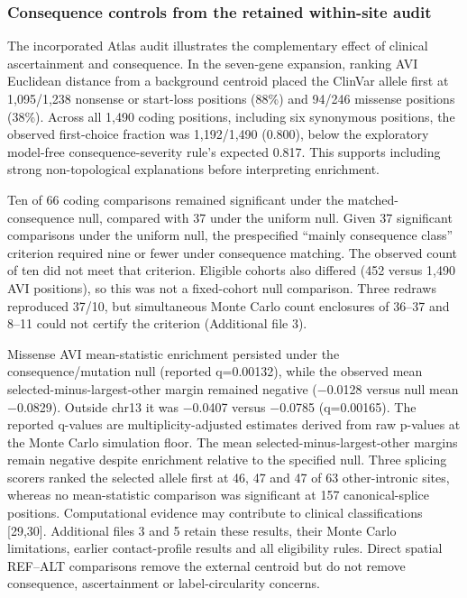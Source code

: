 \documentclass[
  11pt,
]{article}
\begin{document}
\subsubsection{Consequence controls from the retained within-site
audit}\label{consequence-controls-from-the-retained-within-site-audit}

The incorporated Atlas audit illustrates the complementary effect of
clinical ascertainment and consequence. In the seven-gene expansion,
ranking AVI Euclidean distance from a background centroid placed the
ClinVar allele first at 1,095/1,238 nonsense or start-loss positions
(88\%) and 94/246 missense positions (38\%). Across all 1,490 coding
positions, including six synonymous positions, the observed first-choice
fraction was 1,192/1,490 (0.800), below the exploratory model-free
consequence-severity rule's expected 0.817. This supports including
strong non-topological explanations before interpreting enrichment.

Ten of 66 coding comparisons remained significant under the
matched-consequence null, compared with 37 under the uniform null. Given
37 significant comparisons under the uniform null, the prespecified
``mainly consequence class'' criterion required nine or fewer under
consequence matching. The observed count of ten did not meet that
criterion. Eligible cohorts also differed (452 versus 1,490 AVI
positions), so this was not a fixed-cohort null comparison. Three
redraws reproduced 37/10, but simultaneous Monte Carlo count enclosures
of 36--37 and 8--11 could not certify the criterion (Additional file 3).

Missense AVI mean-statistic enrichment persisted under the
consequence/mutation null (reported q=0.00132), while the observed mean
selected-minus-largest-other margin remained negative (−0.0128 versus
null mean −0.0829). Outside chr13 it was −0.0407 versus −0.0785
(q=0.00165). The reported q-values are multiplicity-adjusted estimates
derived from raw p-values at the Monte Carlo simulation floor. The mean
selected-minus-largest-other margins remain negative despite enrichment
relative to the specified null. Three splicing scorers ranked the
selected allele first at 46, 47 and 47 of 63 other-intronic sites,
whereas no mean-statistic comparison was significant at 157
canonical-splice positions. Computational evidence may contribute to
clinical classifications {[}29,30{]}. Additional files 3 and 5 retain
these results, their Monte Carlo limitations, earlier contact-profile
results and all eligibility rules. Direct spatial REF--ALT comparisons
remove the external centroid but do not remove consequence,
ascertainment or label-circularity concerns.
\end{document}
